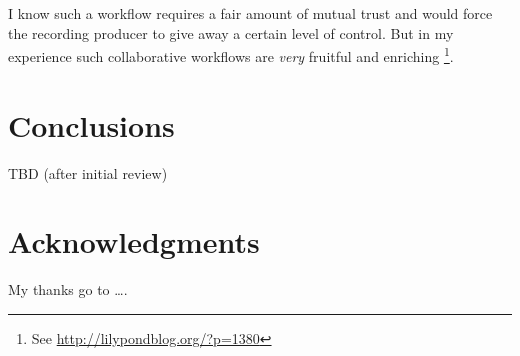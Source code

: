 \documentclass[11pt,a4paper]{article}
\begin{document}
I know such a workflow requires a fair amount of mutual trust and would force the
recording producer to give away a certain level of control.
But in my experience such collaborative workflows are \emph{very} fruitful and
enriching%
\footnote{See \url{http://lilypondblog.org/?p=1380}}.


\section{Conclusions}

TBD (after initial review)


\section{Acknowledgments}

My thanks go to \ldots .
\end{document}
